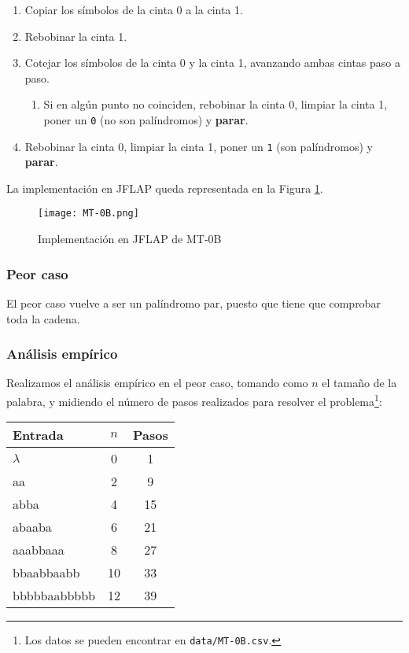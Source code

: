 \begin{enumerate}
    \item Copiar los símbolos de la cinta 0 a la cinta 1.
    \item Rebobinar la cinta 1.
    \item Cotejar los símbolos de la cinta 0 y la cinta 1, avanzando ambas cintas paso a paso.
    \begin{enumerate}[1.]
        \item Si en algún punto no coinciden, rebobinar la cinta 0, limpiar la cinta 1, poner un \texttt{0} (no son palíndromos) y \textbf{parar}.
    \end{enumerate}
    \item Rebobinar la cinta 0, limpiar la cinta 1, poner un \texttt{1} (son palíndromos) y \textbf{parar}.
\end{enumerate}

La implementación en JFLAP queda representada en la Figura \ref{fig:MT-0B}.

\begin{figure}[h]
    \texttt{[image: MT-0B.png]}
    \caption{Implementación en JFLAP de MT-0B}
    \label{fig:MT-0B}
\end{figure}

\subsubsection*{Peor caso}
El peor caso vuelve a ser un palíndromo par, puesto que tiene que comprobar toda la cadena.

\subsubsection*{Análisis empírico}

Realizamos el análisis empírico en el peor caso, tomando como $n$ el tamaño de la palabra, y midiendo el número de pasos realizados para resolver el problema\footnote{Los datos se pueden encontrar en \texttt{data/MT-0B.csv}.}:

\begin{table}[h]
    \centering
    \begin{tabular}{lcc}
        Entrada & $n$ & Pasos \\
        \hline
        $\lambda$      & 0  & 1  \\
        aa             & 2  & 9  \\
        abba           & 4  & 15 \\
        abaaba         & 6  & 21 \\
        aaabbaaa       & 8  & 27 \\
        bbaabbaabb     & 10 & 33 \\
        bbbbbaabbbbb   & 12 & 39
    \end{tabular}
\end{table}


